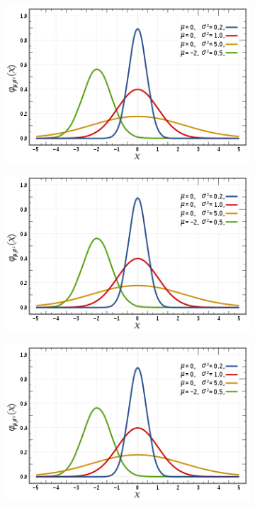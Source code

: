 \begin{figure}[!htb]
    \centering
    \begin{subfigure}{0.4\textwidth}
        \includegraphics[width=\textwidth]{figures/gambar.png}
        \caption{}
        \label{fig:first_nocaption}
    \end{subfigure}
    \begin{subfigure}{0.4\textwidth}
        \includegraphics[width=\textwidth]{figures/gambar.png}
        \caption{}
        \label{fig:second_nocaption}
    \end{subfigure}
    \begin{subfigure}{0.4\textwidth}
        \includegraphics[width=\textwidth]{figures/gambar.png}

\end{subfigure}
\end{figure}
